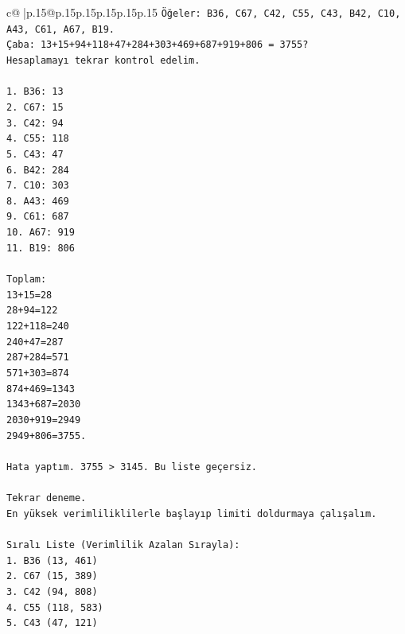 \documentclass{article}
\begin{document}
{\begin{supertabular}{c@{$\;$}|p{.15\linewidth}@{}p{.15\linewidth}p{.15\linewidth}p{.15\linewidth}p{.15\linewidth}p{.15\linewidth}}
{{{\texttt{Öğeler: B36, C67, C42, C55, C43, B42, C10, A43, C61, A67, B19.} \\
\texttt{Çaba: 13+15+94+118+47+284+303+469+687+919+806 = 3755?} \\
\texttt{Hesaplamayı tekrar kontrol edelim.} \\
\\ 
\texttt{1. B36: 13} \\
\texttt{2. C67: 15} \\
\texttt{3. C42: 94} \\
\texttt{4. C55: 118} \\
\texttt{5. C43: 47} \\
\texttt{6. B42: 284} \\
\texttt{7. C10: 303} \\
\texttt{8. A43: 469} \\
\texttt{9. C61: 687} \\
\texttt{10. A67: 919} \\
\texttt{11. B19: 806} \\
\\ 
\texttt{Toplam:} \\
\texttt{13+15=28} \\
\texttt{28+94=122} \\
\texttt{122+118=240} \\
\texttt{240+47=287} \\
\texttt{287+284=571} \\
\texttt{571+303=874} \\
\texttt{874+469=1343} \\
\texttt{1343+687=2030} \\
\texttt{2030+919=2949} \\
\texttt{2949+806=3755.} \\
\\ 
\texttt{Hata yaptım. 3755 > 3145. Bu liste geçersiz.} \\
\\ 
\texttt{Tekrar deneme.} \\
\texttt{En yüksek verimliliklilerle başlayıp limiti doldurmaya çalışalım.} \\
\\ 
\texttt{Sıralı Liste (Verimlilik Azalan Sırayla):} \\
\texttt{1. B36 (13, 461)} \\
\texttt{2. C67 (15, 389)} \\
\texttt{3. C42 (94, 808)} \\
\texttt{4. C55 (118, 583)} \\
\texttt{5. C43 (47, 121)} \\
}}}
\end{supertabular}}
\end{document}
